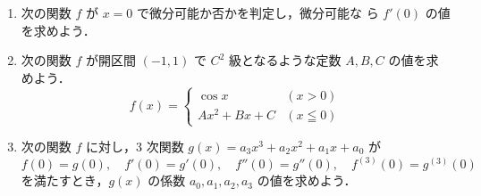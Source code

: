 \documentclass[11pt, uplatex, dvipdfmx, twoside]{jsarticle}
\newcommand{\ds}{\displaystyle}
\begin{document}
\begin{enumerate}[label=\arabic{section}.\arabic*]

  \setlength{\itemsep}{1zh}
  
\item 次の関数 $f$ が $x=0$ で微分可能か否かを判定し，微分可能な
  ら $f'(0)$ の値を求めよう．

  \vspace{1ex}
  

\item 次の関数 $f$ が開区間 $(-1,1)$ で $C^2$ 級となるような定数 $A, B, C$ の値を求めよう．
  \[
    f(x) = \left\{
      \begin{array}{cc}
        \cos x & (x > 0) \\
        Ax^2+Bx+C & (x \leqq 0)
      \end{array}
    \right.
  \]

\item 次の関数 $f$ に対し，$3$ 次関数 $g(x) =a_3 x^3+a_2x^2 + a_1 x + a_0$ が
  \[
    f(0) = g(0), \quad f'(0) = g'(0), \quad f''(0) = g''(0), \quad f^{(3)}(0) = g^{(3)}(0)
  \]
  を満たすとき，$g(x)$ の係数 $a_0, a_1, a_2, a_3$ の値を求めよう．

  \vspace{1ex}
  
\end{enumerate}
\end{document}
